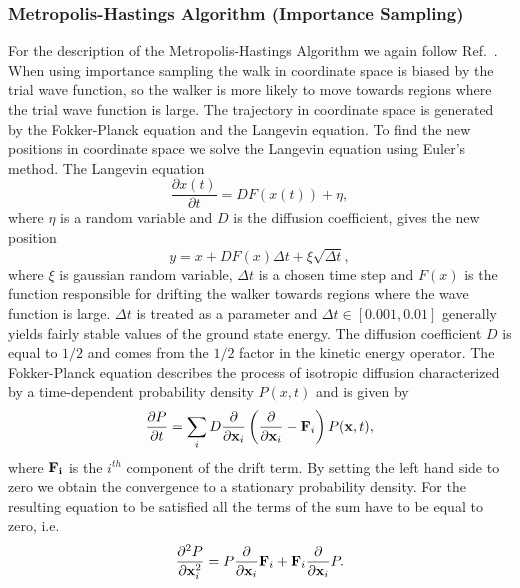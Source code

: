 \documentclass[../main.tex]{subfiles}
\begin{document}
\subsubsection{Metropolis-Hastings Algorithm (Importance Sampling)}

For the description of the Metropolis-Hastings Algorithm we again follow Ref.~\cite{FYS4411-Slides}.
When using importance sampling the walk in coordinate space is biased by the trial wave function, so the walker is more likely to move towards regions where the trial wave function is large. The trajectory in coordinate space is generated by the Fokker-Planck equation and the Langevin equation. To find the new positions in coordinate space we solve the Langevin equation using Euler's method. The Langevin equation
\begin{equation}\label{Langevin}
 \frac{\partial x(t)}{\partial t} = D F(x(t)) + \eta,
\end{equation}
where $\eta$ is a random variable and $D$ is the diffusion coefficient, gives the new position
\begin{equation}\label{eq: LangevinSolution}
 y = x + DF(x)\Delta t + \xi \sqrt{\Delta t},
\end{equation}
where $\xi$ is gaussian random variable, $\Delta t$ is a chosen time step and $F(x)$ is the function responsible for drifting the walker towards regions where the wave function is large. $\Delta t$ is treated as a parameter and $\Delta t \in [0.001, 0.01]$ generally yields fairly stable values of the ground state energy. The diffusion coefficient $D$ is equal to $1/2$ and comes from the $1/2$ factor in the kinetic energy operator. The Fokker-Planck equation describes the process of isotropic diffusion characterized by a time-dependent probability density $P(x, t)$ and is given by
\begin{equation}
 \frac{\partial P}{\partial t} = \sum_i D \frac{\partial}{\partial {\bf x}_i}\left( \frac{\partial}{\partial {\bf x}_i} - {\bf F}_i \right) P({\bf x}, t),
\end{equation}
where $\bf{F}_i$ is the $i^{th}$ component of the drift term. By setting the left hand side to zero we obtain the convergence to a stationary probability density. For the resulting equation to be satisfied all the terms of the sum have to be equal to zero, i.e.
\begin{equation}\label{stationaryFokker}
 \frac{\partial^2 P}{\partial {\bf x}_i^2} = P \frac{\partial}{\partial {\bf x}_i} {\bf F}_i
 + {\bf F}_i \frac{\partial}{\partial {\bf x}_i} P.
\end{equation}
\end{document}
